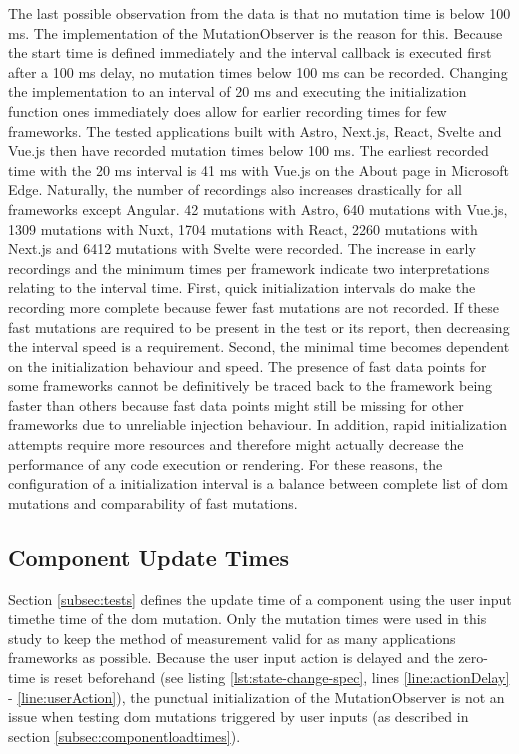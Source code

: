 \documentclass[a4paper, 12pt]{article}
\begin{document}
The last possible observation from the data is that no mutation time is below 100 ms.
The implementation of the MutationObserver is the reason for this.
Because the start time is defined immediately and the interval callback is executed first after a 100 ms delay, no mutation times below 100 ms can be recorded.
Changing the implementation to an interval of 20 ms and executing the initialization function ones immediately does allow for earlier recording times for few frameworks.
The tested applications built with Astro, Next.js, React, Svelte and Vue.js then have recorded mutation times below 100 ms.
The earliest recorded time with the 20 ms interval is 41 ms with Vue.js on the About page in Microsoft Edge.
Naturally, the number of recordings also increases drastically for all frameworks except Angular.
42 mutations with Astro, 640 mutations with Vue.js, 1309 mutations with Nuxt, 1704 mutations with React, 2260 mutations with Next.js and 6412 mutations with Svelte were recorded.
The increase in early recordings and the minimum times per framework indicate two interpretations relating to the interval time.
First, quick initialization intervals do make the recording more complete because fewer fast mutations are not recorded.
If these fast mutations are required to be present in the test or its report, then decreasing the interval speed is a requirement.
Second, the minimal time becomes dependent on the initialization behaviour and speed.
The presence of fast data points for some frameworks cannot be definitively be traced back to the framework being faster than others because fast data points might still be missing for other frameworks due to unreliable injection behaviour.
In addition, rapid initialization attempts require more resources and therefore might actually decrease the performance of any code execution or rendering.
For these reasons, the configuration of a initialization interval is a balance between complete list of \acrshort{dom} mutations and comparability of fast mutations.

\subsection{Component Update Times}\label{subsec:componentupdatetimes}

Section \ref{subsec:tests} defines the update time of a component using the user input timethe time of the \acrshort{dom} mutation.
Only the mutation times were used in this study to keep the method of measurement valid for as many applications frameworks as possible.
Because the user input action is delayed and the zero-time is reset beforehand (see listing \ref{lst:state-change-spec}, lines \ref{line:actionDelay} - \ref{line:userAction}), the punctual initialization of the MutationObserver is not an issue when testing \acrshort{dom} mutations triggered by user inputs (as described in section \ref{subsec:componentloadtimes}).
\end{document}
